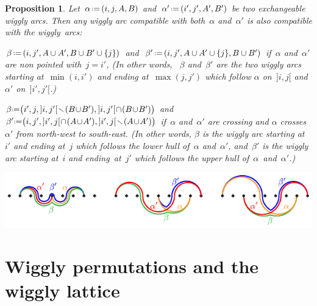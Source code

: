 \documentclass[submission]{FPSAC2025}
\newtheorem{proposition}[theorem]{Proposition}
\theoremstyle{definition}
\newcommand{\ssm}{\smallsetminus} %
\newcommand{\eqdef}{\mbox{\,\raisebox{0.2ex}{\scriptsize\ensuremath{\mathrm:}}\ensuremath{=}\,}} %
\begin{document}
\begin{proposition}
\label{prop:uerp}
Let~$\alpha \eqdef (i, j, A, B)$ and~$\alpha' \eqdef (i', j', A', B')$ be two exchangeable wiggly arcs.
Then any wiggly arc compatible with both~$\alpha$ and~$\alpha'$ is also compatible with the wiggly~arcs:
\begin{compactitem}
\item $\beta \eqdef (i, j', A \cup A', B \cup B' \cup \{j\})$ and~$\beta' \eqdef (i, j', A \cup A' \cup \{j\}, B \cup B')$ if~$\alpha$ and~$\alpha'$ are non pointed with~$j = i'$,
(In other words, ~$\beta$ and~$\beta'$ are the two wiggly arcs starting at~$\min(i,i')$ and ending at~$\max(j,j')$ which follow $\alpha$ on~$]i,j[$ and~$\alpha'$ on~$]i',j'[$.)
\item $\beta \!\eqdef\! \big( i', j, {]i,j'[} \!\ssm\! (B \!\cup\! B'), {]i,j'[} \!\cap\! (B \!\cup\! B') \big)$ and~$\beta' \!\eqdef\! \big( i, j', {]i',j[} \!\cap\! (A \!\cup\! A'), {]i',j[} \!\ssm\! (A \!\cup\! A') \big)$ if~$\alpha$ and~$\alpha'$ are crossing and $\alpha$ crosses~$\alpha'$ from north-west to south-east.
(In other words, $\beta$ is the wiggly arc starting at~$i'$ and ending at~$j$ which follows the lower hull of~$\alpha$ and~$\alpha'$, and~$\beta'$ is the wiggly arc starting at~$i$ and ending~at~$j'$ which follows the upper hull of~$\alpha$~and~$\alpha'$.)
\end{compactitem}
%

\vspace{.1cm}
\centerline{\includegraphics[scale=1.55]{incompatible3}}
\end{proposition}

\section{Wiggly permutations and the wiggly lattice}
\label{sec:wigglyPermutations}
\end{document}
